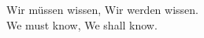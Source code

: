 
%



\begin{ntquote}
  Wir müssen wissen, Wir werden wissen.\\
  We must know, We shall know.%
\end{ntquote}
  
